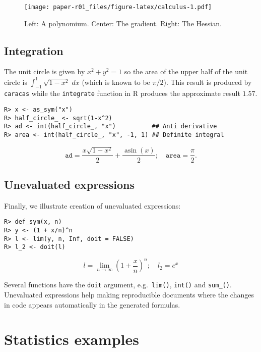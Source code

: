 \begin{figure}
\centering
\texttt{[image: paper-r01\_files/figure-latex/calculus-1.pdf]}
\caption{\label{fig:calculus}Left: A polynomium. Center: The gradient. Right: The Hessian.}
\end{figure}

\hypertarget{integration}{%
\subsection{Integration}\label{integration}}

The unit circle is given by \(x^2 + y^2 = 1\) so the area of the upper
half of the unit circle is \(\int_{-1}^1 \sqrt{1-x^2}\; dx\) (which is
known to be \(\pi/2\)). This result is produced by \texttt{caracas} while the
\texttt{integrate} function in R produces the approximate result \(1.57\).

\begin{verbatim}
R> x <- as_sym("x")
R> half_circle_ <- sqrt(1-x^2)
R> ad <- int(half_circle_, "x")          ## Anti derivative
R> area <- int(half_circle_, "x", -1, 1) ## Definite integral
\end{verbatim}

\[
\texttt{ad} = \frac{x \sqrt{1 - x^{2}}}{2} + \frac{\operatorname{asin}{\left(x \right)}}{2}; \quad
\texttt{area} = \frac{\pi}{2}.
\]

\hypertarget{unevaluated-expressions}{%
\subsection{Unevaluated expressions}\label{unevaluated-expressions}}

Finally, we illustrate creation of unevaluated expressions:

\begin{verbatim}
R> def_sym(x, n)
R> y <- (1 + x/n)^n
R> l <- lim(y, n, Inf, doit = FALSE)
R> l_2 <- doit(l)
\end{verbatim}

\[
l = \lim_{n \to \infty} \left(1 + \frac{x}{n}\right)^{n}; \quad l_2 = e^{x}
\]

Several functions have the \texttt{doit} argument, e.g.~\texttt{lim()}, \texttt{int()} and \texttt{sum\_()}.
Unevaluated expressions help making reproducible documents where the changes
in code appears automatically in the generated formulas.

\hypertarget{statistics-examples}{%
\section{Statistics examples}\label{statistics-examples}}

